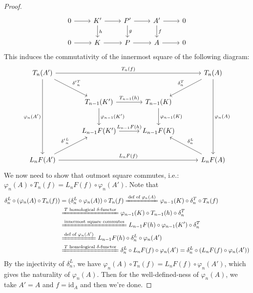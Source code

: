 \begin{proof}
    \[
    \begin{tikzcd}
        0\arrow[r] &K'\arrow[r] \arrow[d, "h"] &P'\arrow[r] \arrow[d, "g"] &A' \arrow[r] \arrow[d, "f"] &0\\
        0\arrow[r] &K\arrow[r] &P\arrow[r] &A\arrow[r] &0
    \end{tikzcd}
    \]
    This induces the commutativity of the innermost square of the following diagram:
    \[
    \begin{tikzcd}[row sep=2.5em, column sep=3em]
    T_n(A') \arrow[rrr, "T_n(f)"] \arrow[ddd, "\varphi_n(A')"'] \arrow[dr, "\delta{'}_n^T"] & & & T_n(A) \arrow[ddd, "\varphi_n(A)"] \arrow[dl, "\delta_n^T"'] \\
    & T_{n-1}(K') \arrow[r, "T_{n-1}(h)"] \arrow[d, "\varphi_{n-1}(K')"] & T_{n-1}(K) \arrow[d, "\varphi_{n-1}(K)"] & \\
    & L_{n-1}F(K') \arrow[r, "L_{n-1}F(h)"] & L_{n-1}F(K) & \\
    L_n F(A') \arrow[rrr, "L_n F(f)"] \arrow[ur, "\delta{'}_n^L"] & & & L_n F(A) \arrow[ul, "\delta_n^L"']
    \end{tikzcd}
    \]
    We now need to show that outmost square commutes, i.e.: $\varphi_n (A)\circ T_n(f)= L_nF(f) \circ \varphi_n(A')$. Note that 
    \begin{align*}
        \delta_n^L \circ (\varphi_n(A) \circ T_n(f)) &= (\delta_n^L \circ \varphi_n(A)) \circ T_n(f) \xlongequal{\text{def of } \varphi_n(A)} \varphi_{n-1} (K) \circ \delta_n^T \circ T_n(f)\\
        &\xlongequal{T \text{ homological }\delta \text{-functor}} \varphi_{n-1} (K) \circ T_{n-1} (h) \circ \delta_n^T\\
        &\xlongequal{\text{innermost square commutes}} L_{n-1} F(h) \circ \varphi_{n-1} (K') \circ \delta_n^T\\
        &\xlongequal{\text{def of }\varphi_n(A')} L_{n-1} F(h) \circ \delta_n^L \circ \varphi_n(A')\\
        &\xlongequal{T\text{ homological }\delta \text{-functor}} \delta_n^L \circ L_nF(f) \circ \varphi_n (A')= \delta_n^L \circ (L_nF(f)\circ \varphi_n (A'))
    \end{align*}
    By the injectivity of $\delta_n^L$, we have $\varphi_n (A) \circ T_n(f) =L_n F(f) \circ \varphi_n (A')$, which gives the naturality of $\varphi_n(A)$. Then for the well-defined-ness of $\varphi_n(A)$, we take $A'=A$ and $f=\text{id}_A$ and then we're done.


\end{proof}
